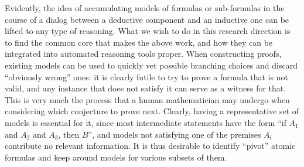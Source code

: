 Evidently, the idea of accumulating models of formulas or sub-formulas in the course of
a dialog between a deductive component and an inductive one can be lifted to
any type of reasoning.
What we wish to do in this research direction is to find the common core that makes the above work,
and how they can be integrated into automated reasoning tools proper.
When constructing proofs, existing models can be used to quickly vet possible
branching choices and discard ``obviously wrong'' ones: it is clearly futile
to try to prove a formula that is not valid, and any instance that does not
satisfy it can serve as a witness for that.
This is very much the process that a human mathematician may undergo when
considering which conjecture to prove next.
Clearly, having a representative set of models is essential for it, since
most intermediate statements have the form ``if $A_1$ and $A_2$ and $A_3$, then
$B$'', and models not satisfying one of the premises $A_i$ contribute no
relevant information.
It is thus desirable to identify ``pivot'' atomic formulas and keep around
models for various subsets of them.